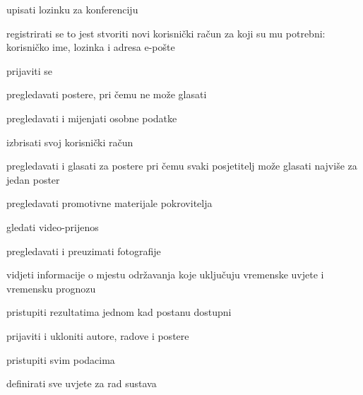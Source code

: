 			\begin{packed_enum}
				\item  {}
				
				\begin{packed_enum}
					
					\item upisati lozinku za konferenciju
					\item registrirati se to jest stvoriti novi korisnički račun za koji su mu potrebni: korisničko ime, lozinka i adresa e-pošte
					\item prijaviti se
					\item pregledavati postere, pri čemu ne može glasati
					
				\end{packed_enum}
			
				\item  {}
				
				\begin{packed_enum}
					
					\item pregledavati i mijenjati osobne podatke
					\item izbrisati svoj korisnički račun
					\item pregledavati i glasati za postere pri čemu svaki posjetitelj može glasati najviše za jedan poster
					\item pregledavati promotivne materijale pokrovitelja
					\item gledati video-prijenos
					\item pregledavati i preuzimati fotografije
					\item vidjeti informacije o mjestu održavanja koje uključuju vremenske uvjete i vremensku prognozu
					\item pristupiti rezultatima jednom kad postanu dostupni
				
				\end{packed_enum}
				
				\item {}
				
				\begin{packed_enum}
					
					\item prijaviti i ukloniti autore, radove i postere
					\item pristupiti svim podacima
					\item definirati sve uvjete za rad sustava
					

\end{packed_enum}
\end{packed_enum}
